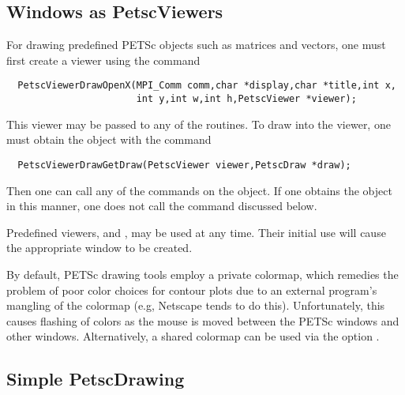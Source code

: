 \subsection{Windows as PetscViewers}
For drawing predefined PETSc objects such as matrices and vectors, one must 
first create a viewer using the 
command 
\begin{verbatim}
  PetscViewerDrawOpenX(MPI_Comm comm,char *display,char *title,int x,
                       int y,int w,int h,PetscViewer *viewer);
\end{verbatim}
This viewer may be passed to any of the  routines.
To draw into the viewer, one must obtain the  object with the
command 
\begin{verbatim}
  PetscViewerDrawGetDraw(PetscViewer viewer,PetscDraw *draw);
\end{verbatim}
Then one can call any of the  commands on the 
object. If one obtains the  object in this manner, 
one does not call the  command discussed below.

  
Predefined viewers,  
and , may be used at any time. Their initial
use will cause the appropriate window to be created.

\medskip
By default, PETSc drawing tools employ a private colormap,
which remedies the problem of poor color choices for contour plots due
to an external program's mangling of the colormap (e.g, Netscape tends
to do this).
Unfortunately, this causes flashing of colors as the mouse is moved
between the PETSc windows and other windows.  Alternatively, a shared
colormap can be used via the option .

\subsection{Simple PetscDrawing}

